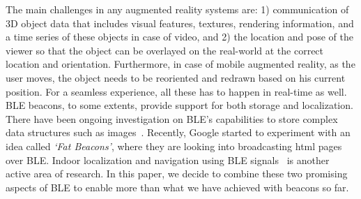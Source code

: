 The main challenges in any augmented reality systems are: 1) communication of 3D object data that includes visual features, textures, rendering information, and a time series of these objects in case of video, and 2) the location and pose of the viewer so that the object can be overlayed on the real-world at the correct location and orientation. Furthermore, in case of mobile augmented reality, as the user moves, the object needs to be reoriented and redrawn based on his current position. For a seamless experience, all these has to happen in real-time as well. BLE beacons, to some extents, provide support for both storage and localization. There have been ongoing investigation on BLE's capabilities to store complex data structures such as images~\cite{shaoyears}. Recently, Google started to experiment with an idea called \textit{`Fat Beacons'}, where they are looking into broadcasting html pages over BLE. Indoor localization and navigation using BLE signals~\cite{zhuang2016smartphone, martin2014ibeacon} is another active area of research. In this paper, we decide to combine these two promising aspects of BLE to enable more than what we have achieved with beacons so far.





